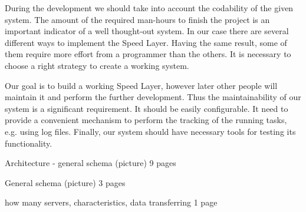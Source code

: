 During the development we should take into account the codability of the given system.
The amount of the required man-hours to finish the project is an important indicator of a well thought-out system.
In our case there are several different ways to implement the Speed Layer.
Having the same result, some of them require more effort from a programmer than the others.
It is necessary to choose a right strategy to create a working system.

Our goal is to build a working Speed Layer, however later other people will maintain it and perform the further development.
Thus the maintainability of our system is a significant requirement.
It should be easily configurable.
It need to provide a convenient mechanism to perform the tracking of the running tasks, e.g. using log files.
Finally, our system should have necessary tools for testing its functionality.

Architecture - general schema (picture)
9 pages

General schema (picture)
3 pages


how many servers, characteristics, data transferring
1 page